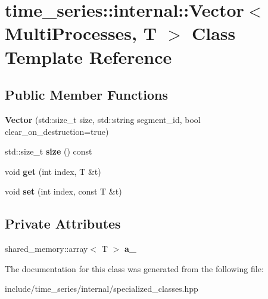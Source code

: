 \hypertarget{classtime__series_1_1internal_1_1Vector_3_01MultiProcesses_00_01T_01_4}{}\section{time\+\_\+series\+:\+:internal\+:\+:Vector$<$ Multi\+Processes, T $>$ Class Template Reference}
\label{classtime__series_1_1internal_1_1Vector_3_01MultiProcesses_00_01T_01_4}
\subsection*{Public Member Functions}
\begin{DoxyCompactItemize}
\item 
\mbox{\label{classtime__series_1_1internal_1_1Vector_3_01MultiProcesses_00_01T_01_4_af2529e8e4d338b81ccc7faa63bf61c15}} 
{\bfseries Vector} (std\+::size\+\_\+t size, std\+::string segment\+\_\+id, bool clear\+\_\+on\+\_\+destruction=true)
\item 
\mbox{\label{classtime__series_1_1internal_1_1Vector_3_01MultiProcesses_00_01T_01_4_af526e73f3117fec0e2b76fe7e63dfb77}} 
std\+::size\+\_\+t {\bfseries size} () const
\item 
\mbox{\label{classtime__series_1_1internal_1_1Vector_3_01MultiProcesses_00_01T_01_4_a790ce3cdc41c84248ddc534466d00453}} 
void {\bfseries get} (int index, T \&t)
\item 
\mbox{\label{classtime__series_1_1internal_1_1Vector_3_01MultiProcesses_00_01T_01_4_a3b39a3c251c76c67ca3993d08a3374c0}} 
void {\bfseries set} (int index, const T \&t)
\end{DoxyCompactItemize}
\subsection*{Private Attributes}
\begin{DoxyCompactItemize}
\item 
\mbox{\label{classtime__series_1_1internal_1_1Vector_3_01MultiProcesses_00_01T_01_4_af14f14dd6be5f8905a43e0e375257d94}} 
shared\+\_\+memory\+::array$<$ T $>$ {\bfseries a\+\_\+}
\end{DoxyCompactItemize}


The documentation for this class was generated from the following file\+:\begin{DoxyCompactItemize}
\item 
include/time\+\_\+series/internal/specialized\+\_\+classes.\+hpp\end{DoxyCompactItemize}
